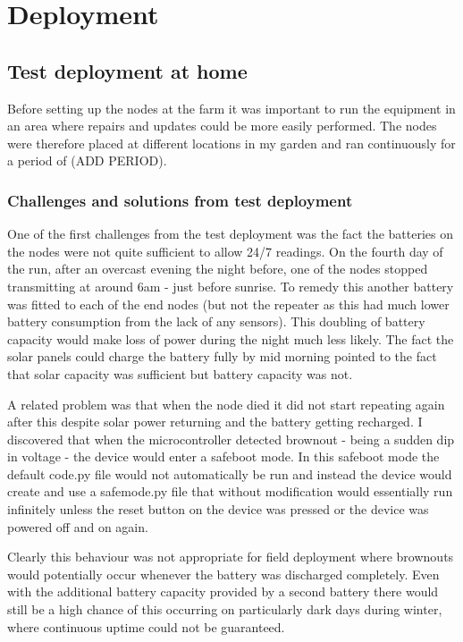 \section{Deployment}

\subsection{Test deployment at home}

Before setting up the nodes at the farm it was important to run the equipment in
an area where repairs and updates could be more easily performed. The nodes were
therefore placed at different locations in my garden and ran continuously for a
period of (ADD PERIOD).

\subsubsection{Challenges and solutions from test deployment}

One of the first challenges from the test deployment was the fact the batteries
on the nodes were not quite sufficient to allow 24/7 readings. On the fourth day
of the run, after an overcast evening the night before, one of the nodes stopped
transmitting at around 6am - just before sunrise. To remedy this another battery
was fitted to each of the end nodes (but not the repeater as this had much lower
battery consumption from the lack of any sensors). This doubling of battery
capacity would make loss of power during the night much less likely. The fact
the solar panels could charge the battery fully by mid morning pointed to the
fact that solar capacity was sufficient but battery capacity was not.

A related problem was that when the node died it did not start repeating again
after this despite solar power returning and the battery getting recharged. I
discovered that when the microcontroller detected brownout - being a sudden dip
in voltage - the device would enter a safeboot mode. In this safeboot mode the
default code.py file would not automatically be run and instead the device would
create and use a safemode.py file that without modification would essentially
run infinitely unless the reset button on the device was pressed or the device
was powered off and on again.

Clearly this behaviour was not appropriate for field deployment where brownouts
would potentially occur whenever the battery was discharged completely. Even
with the additional battery capacity provided by a second battery there would
still be a high chance of this occurring on particularly dark days during
winter, where continuous uptime could not be guaranteed.


